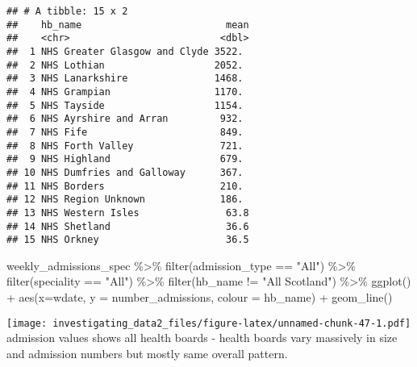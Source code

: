\documentclass[
]{article}
\newenvironment{Shaded}{\begin{snugshade}}{\end{snugshade}}
\newcommand{\AttributeTok}[1]{\textcolor[rgb]{0.77,0.63,0.00}{#1}}
\newcommand{\FunctionTok}[1]{\textcolor[rgb]{0.00,0.00,0.00}{#1}}
\newcommand{\NormalTok}[1]{#1}
\newcommand{\SpecialCharTok}[1]{\textcolor[rgb]{0.00,0.00,0.00}{#1}}
\newcommand{\StringTok}[1]{\textcolor[rgb]{0.31,0.60,0.02}{#1}}
\begin{document}
\begin{verbatim}
## # A tibble: 15 x 2
##    hb_name                         mean
##    <chr>                          <dbl>
##  1 NHS Greater Glasgow and Clyde 3522. 
##  2 NHS Lothian                   2052. 
##  3 NHS Lanarkshire               1468. 
##  4 NHS Grampian                  1170. 
##  5 NHS Tayside                   1154. 
##  6 NHS Ayrshire and Arran         932. 
##  7 NHS Fife                       849. 
##  8 NHS Forth Valley               721. 
##  9 NHS Highland                   679. 
## 10 NHS Dumfries and Galloway      367. 
## 11 NHS Borders                    210. 
## 12 NHS Region Unknown             186. 
## 13 NHS Western Isles               63.8
## 14 NHS Shetland                    36.6
## 15 NHS Orkney                      36.5
\end{verbatim}

\begin{Shaded}
\begin{Highlighting}[]
\NormalTok{weekly\_admissions\_spec }\SpecialCharTok{\%\textgreater{}\%} 
  \FunctionTok{filter}\NormalTok{(admission\_type }\SpecialCharTok{==} \StringTok{"All"}\NormalTok{) }\SpecialCharTok{\%\textgreater{}\%} 
  \FunctionTok{filter}\NormalTok{(speciality }\SpecialCharTok{==} \StringTok{"All"}\NormalTok{) }\SpecialCharTok{\%\textgreater{}\%} 
  \FunctionTok{filter}\NormalTok{(hb\_name }\SpecialCharTok{!=} \StringTok{"All Scotland"}\NormalTok{) }\SpecialCharTok{\%\textgreater{}\%} 
\FunctionTok{ggplot}\NormalTok{() }\SpecialCharTok{+}
\FunctionTok{aes}\NormalTok{(}\AttributeTok{x=}\NormalTok{wdate, }\AttributeTok{y =}\NormalTok{ number\_admissions, }\AttributeTok{colour =}\NormalTok{ hb\_name) }\SpecialCharTok{+}
\FunctionTok{geom\_line}\NormalTok{()}
\end{Highlighting}
\end{Shaded}

\texttt{[image: investigating\_data2\_files/figure-latex/unnamed-chunk-47-1.pdf]}
admission values shows all health boards - health boards vary massively
in size and admission numbers but mostly same overall pattern.
\end{document}
